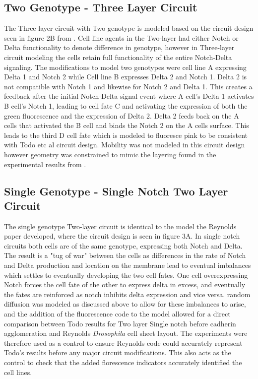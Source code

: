 \documentclass[12pt]{ifacconf}
\begin{document}
\subsection{Two Genotype - Three Layer Circuit}

The Three layer circuit with Two genotype is modeled based on the circuit design seen in figure 2B from \cite{TP:18}. Cell line agents in the Two-layer had either Notch or Delta functionality to denote difference in genotype, however in Three-layer circuit modeling the cells retain full functionality of the entire Notch-Delta signaling. The modifications to model two genotypes were cell line A expressing Delta 1 and Notch 2 while Cell line B expresses Delta 2 and Notch 1. Delta 2 is not compatible with Notch 1 and likewise for Notch 2 and Delta 1. This creates a feedback after the initial Notch-Delta signal event where A cell's Delta 1 activates B cell's Notch 1, leading to cell fate C and activating the expression of both the green fluorescence and the expression of Delta 2. Delta 2 feeds back on the A cells that activated the B cell and binds the Notch 2 on the A cells surface. This leads to the third D cell fate which is modeled to fluoresce pink to be consistent with Todo etc al circuit design. Mobility was not modeled in this circuit design however geometry was constrained to mimic the layering found in the experimental results from \cite{TP:18}. 


\subsection{Single Genotype - Single Notch Two Layer Circuit}

The single genotype Two-layer circuit is identical to the model the Reynolds paper developed, where the circuit design is seen in figure 3A. In single notch circuits both cells are of the same genotype, expressing both Notch and Delta. The result is a "tug of war" between the cells as differences in the rate of Notch and Delta production and location on the membrane lead to eventual imbalances which settles to eventually developing the two cell fates. One cell overexpressing Notch forces the cell fate of the other to express delta in excess, and eventually the fates are reinforced as notch inhibits delta expression and vice versa. random diffusion was modeled as discussed above to allow for these imbalances to arise, and the addition of the fluorescence code to the model allowed for a direct comparison between Todo results for Two layer Single notch before cadherin agglomeration and Reynolds \emph{Drosophila} cell sheet layout. The experiments were therefore used as a control to ensure Reynolds code could accurately represent Todo's results before any major circuit modifications. This also acts as the control to check that the added florescence indicators accurately identified the cell lines. 
\end{document}
